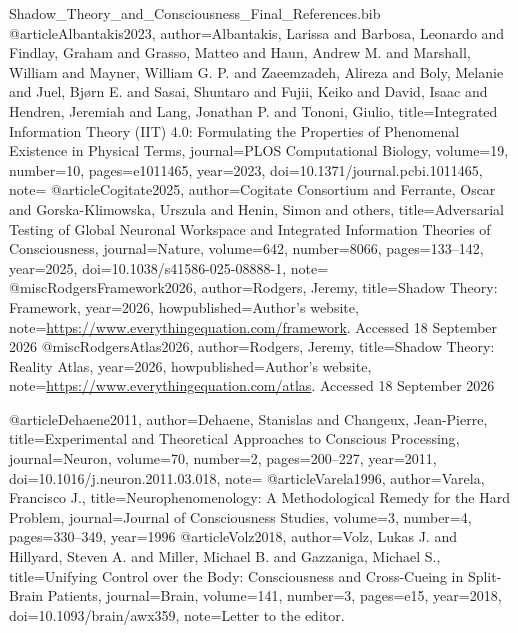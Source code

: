 \begin{filecontents*}[overwrite]{Shadow_Theory_and_Consciousness_Final_References.bib}
@article{Albantakis2023,
 author={Albantakis, Larissa and Barbosa, Leonardo and Findlay, Graham and Grasso, Matteo and Haun, Andrew M. and Marshall, William and Mayner, William G. P. and Zaeemzadeh, Alireza and Boly, Melanie and Juel, Bj{\o}rn E. and Sasai, Shuntaro and Fujii, Keiko and David, Isaac and Hendren, Jeremiah and Lang, Jonathan P. and Tononi, Giulio},
 title={Integrated Information Theory ({IIT}) 4.0: Formulating the Properties of Phenomenal Existence in Physical Terms},
 journal={PLOS Computational Biology}, volume={19}, number={10}, pages={e1011465}, year={2023},
 doi={10.1371/journal.pcbi.1011465}, note={}
}
@article{Cogitate2025,
 author={{Cogitate Consortium} and Ferrante, Oscar and Gorska-Klimowska, Urszula and Henin, Simon and others},
 title={Adversarial Testing of Global Neuronal Workspace and Integrated Information Theories of Consciousness},
 journal={Nature}, volume={642}, number={8066}, pages={133--142}, year={2025},
 doi={10.1038/s41586-025-08888-1}, note={}
}
@misc{RodgersFramework2026,
 author={Rodgers, Jeremy},
 title={Shadow Theory: Framework}, year={2026},
 howpublished={Author's website},
 note={\url{https://www.everythingequation.com/framework}. Accessed 18 September 2026}
}
@misc{RodgersAtlas2026,
 author={Rodgers, Jeremy},
 title={Shadow Theory: Reality Atlas}, year={2026},
 howpublished={Author's website},
 note={\url{https://www.everythingequation.com/atlas}. Accessed 18 September 2026}
}

@article{Dehaene2011,
 author={Dehaene, Stanislas and Changeux, Jean-Pierre},
 title={Experimental and Theoretical Approaches to Conscious Processing},
 journal={Neuron}, volume={70}, number={2}, pages={200--227}, year={2011},
 doi={10.1016/j.neuron.2011.03.018},
 note={}
}
@article{Varela1996,
 author={Varela, Francisco J.},
 title={Neurophenomenology: A Methodological Remedy for the Hard Problem},
 journal={Journal of Consciousness Studies}, volume={3}, number={4}, pages={330--349}, year={1996}
}
@article{Volz2018,
 author={Volz, Lukas J. and Hillyard, Steven A. and Miller, Michael B. and Gazzaniga, Michael S.},
 title={Unifying Control over the Body: Consciousness and Cross-Cueing in Split-Brain Patients},
 journal={Brain}, volume={141}, number={3}, pages={e15}, year={2018},
 doi={10.1093/brain/awx359},
 note={Letter to the editor. }
}


\end{filecontents*}

